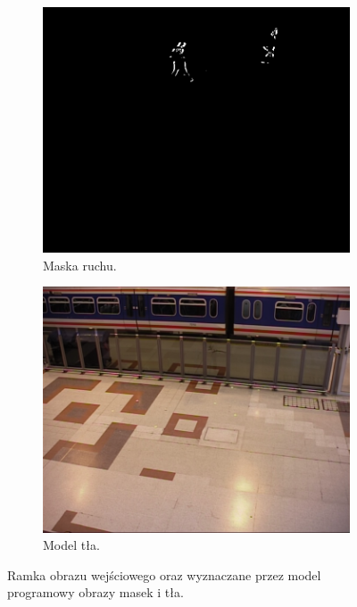 \begin{figure}[H]
	\begin{subfigure}[b]{0.49\textwidth}
		\includegraphics[width=\textwidth]{img/bg-mo.png}
		\caption{Maska ruchu.}
	\end{subfigure}
	\hfill
	\begin{subfigure}[b]{0.49\textwidth}
		\includegraphics[width=\textwidth]{img/bg-model.png}
		\caption{Model tła.}
	\end{subfigure}
	\caption{Ramka obrazu wejściowego oraz wyznaczane przez model programowy obrazy masek i tła.}
	\label{fig:background-model-result}
\end{figure}

